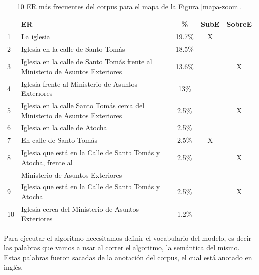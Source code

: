 \begin{table}[H]
{\footnotesize
\begin{center}
\begin{tabular}{|l|l|c|c|c|}
\hline
&ER 					       &  \% & SubE & SobreE\\ \hline \hline
1&La iglesia 																																		 &19.7\%  & X & \\ \hline
2&Iglesia en la calle de Santo Tom\'as																									 &18.5\% 	&  & \\ \hline
3&Iglesia en la calle de Santo Tom\'as frente al Ministerio de Asuntos Exteriores        &13.6\% &  &X \\ \hline
4&Iglesia frente al Ministerio de Asuntos Exteriores 													 &13\% &  & \\ \hline
5&Iglesia en la calle Santo Tom\'as cerca del Ministerio de Asuntos Exteriores        &2.5\% &  &X \\ \hline
6&Iglesia en la calle de Atocha																									 &2.5\%  &  & \\ \hline
7&En calle de Santo Tom\'as 																													 &2.5\% 	& X & \\ \hline
8&Iglesia que est\'a en la Calle de Santo Tom\'as y Atocha, frente al 									 &2.5\%	&  &X \\ 
&Ministerio de Asuntos Exteriores																		 &&& \\ \hline
9&Iglesia que est\'a en la Calle de Santo Tom\'as y Atocha										 &2.5\% 	&  &X \\ \hline
10&Iglesia cerca del Ministerio de Asuntos Exteriores														 &1.2\% 	&  & \\ \hline
\end{tabular}
\caption{10 ER m\'as frecuentes del corpus para el mapa de la Figura \ref{mapa-zoom}.}\label{freq-mapa}
\end{center}
}%
\end{table}


Para ejecutar el algoritmo necesitamos definir el vocabulario del modelo, es decir las palabras que vamos a usar al correr el algoritmo, la sem\'antica del mismo. Estas palabras fueron sacadas de la anotaci\'on del corpus, el cual est\'a anotado en ingl\'es. 

